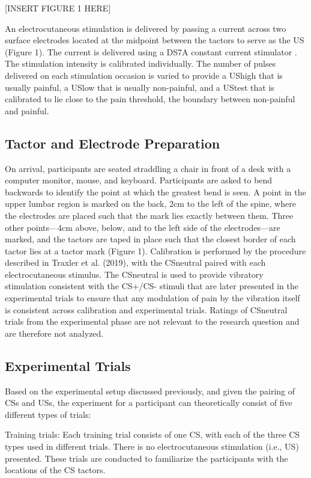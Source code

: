 \documentclass{article}
\begin{document}
[INSERT FIGURE 1 HERE]

An electrocutaneous stimulation is delivered by passing a current across two surface electrodes located at the midpoint between the tactors to serve as the US (Figure 1). The current is delivered using a DS7A constant current stimulator \autocite{bib(DigitimerLimitedn.d.)}. The stimulation intensity is calibrated individually. The number of pulses delivered on each stimulation occasion is varied to provide a UShigh that is usually painful, a USlow that is usually non-painful, and a UStest that is calibrated to lie close to the pain threshold, the boundary between non-painful and painful.

\subsection{Tactor and Electrode Preparation}

On arrival, participants are seated straddling a chair in front of a desk with a computer monitor, mouse, and keyboard. Participants are asked to bend backwards to identify the point at which the greatest bend is seen. A point in the upper lumbar region is marked on the back, 2cm to the left of the spine, where the electrodes are placed such that the mark lies exactly between them. Three other points—4cm above, below, and to the left side of the electrodes—are marked, and the tactors are taped in place such that the closest border of each tactor lies at a tactor mark (Figure 1). Calibration is performed by the procedure described in Traxler et al. (2019), with the CSneutral paired with each electrocutaneous stimulus. The CSneutral is used to provide vibratory stimulation consistent with the CS+/CS- stimuli that are later presented in the experimental trials to ensure that any modulation of pain by the vibration itself is consistent across calibration and experimental trials. Ratings of CSneutral trials from the experimental phase are not relevant to the research question and are therefore not analyzed.

\subsection{Experimental Trials}

Based on the experimental setup discussed previously, and given the pairing of CSs and USs, the experiment for a participant can theoretically consist of five different types of trials:

Training trials: Each training trial consists of one CS, with each of the three CS types used in different trials. There is no electrocutaneous stimulation (i.e., US) presented. These trials are conducted to familiarize the participants with the locations of the CS tactors. 
\end{document}
